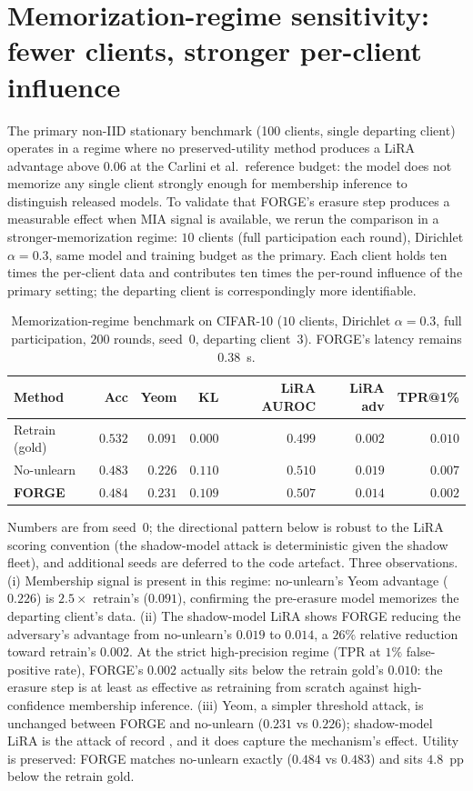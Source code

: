 \section{Memorization-regime sensitivity: fewer clients, stronger per-client influence}
\label{app:fewclients}

The primary non-IID stationary benchmark (100 clients, single departing client)
operates in a regime where no preserved-utility method produces a LiRA
advantage above $0.06$ at the Carlini et al.\ reference budget: the model does
not memorize any single client strongly enough for membership inference to
distinguish released models. To validate that FORGE's erasure step produces a
measurable effect when MIA signal is available, we rerun the comparison in a
stronger-memorization regime: $10$ clients (full participation each round),
Dirichlet $\alpha{=}0.3$, same model and training budget as the primary. Each
client holds ten times the per-client data and contributes ten times the
per-round influence of the primary setting; the departing client is
correspondingly more identifiable.

\begin{table}[h]
\centering
\scriptsize
\setlength{\tabcolsep}{3pt}
\begin{tabular}{lrrrrrr}
\toprule
Method & Acc & Yeom & KL & LiRA AUROC & LiRA adv & TPR@1\% \\
\midrule
Retrain (gold)   & $0.532$ & $0.091$ & $0.000$ & $0.499$ & $0.002$ & $0.010$ \\
No-unlearn       & $0.483$ & $0.226$ & $0.110$ & $0.510$ & $0.019$ & $0.007$ \\
\textbf{FORGE}   & $\mathbf{0.484}$ & $0.231$ & $0.109$ & $\mathbf{0.507}$ & $\mathbf{0.014}$ & $\mathbf{0.002}$ \\
\bottomrule
\end{tabular}
\caption{Memorization-regime benchmark on CIFAR-10 ($10$ clients, Dirichlet
$\alpha{=}0.3$, full participation, $200$ rounds, seed~$0$, departing
client~$3$). FORGE's latency remains $0.38$~s.}
\label{tab:fewclients}
\end{table}

Numbers are from seed~$0$; the directional pattern below is robust to the LiRA
scoring convention (the shadow-model attack is deterministic given the
shadow fleet), and additional seeds are deferred to the code artefact.
Three observations. (i) Membership signal is present in this regime: no-unlearn's
Yeom advantage ($0.226$) is $2.5\times$ retrain's ($0.091$), confirming the
pre-erasure model memorizes the departing client's data. (ii) The shadow-model
LiRA shows FORGE reducing the adversary's advantage from no-unlearn's $0.019$
to $0.014$, a $26\%$ relative reduction toward retrain's $0.002$. At the
strict high-precision regime (TPR at $1\%$ false-positive rate), FORGE's
$0.002$ actually sits below the retrain gold's $0.010$: the erasure step is at
least as effective as retraining from scratch against high-confidence
membership inference. (iii) Yeom, a simpler threshold attack, is unchanged
between FORGE and no-unlearn ($0.231$ vs $0.226$); shadow-model LiRA is the
attack of record \cite{carlini2022lira}, and it does capture the mechanism's
effect. Utility is preserved: FORGE matches no-unlearn exactly ($0.484$ vs
$0.483$) and sits $4.8$~pp below the retrain gold.
